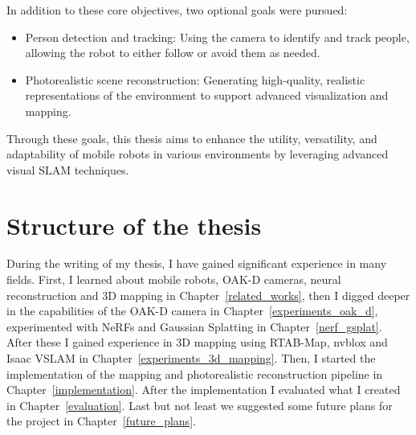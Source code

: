 In addition to these core objectives, two optional goals were pursued:
\begin{itemize}
\setlength\itemsep{0em}
    \item Person detection and tracking: Using the camera to identify and track people, allowing the robot to either follow or avoid them as needed.
    \item Photorealistic scene reconstruction: Generating high-quality, realistic representations of the environment to support advanced visualization and mapping.
\end{itemize}

Through these goals, this thesis aims to enhance the utility, versatility, and adaptability of mobile robots in various environments by leveraging advanced visual SLAM techniques.


\section{Structure of the thesis}

During the writing of my thesis, I have gained significant experience in many fields. First, I learned about mobile robots, OAK-D cameras, neural reconstruction and 3D mapping in Chapter~\ref{related_works}, then I digged deeper in the capabilities of the OAK-D camera in Chapter~\ref{experiments_oak_d}, experimented with NeRFs and Gaussian Splatting in Chapter~\ref{nerf_gsplat}. After these I gained experience in 3D mapping using RTAB-Map, nvblox and Isaac VSLAM in Chapter~\ref{experiments_3d_mapping}. Then, I started the implementation of the mapping and photorealistic reconstruction pipeline in Chapter~\ref{implementation}. After the implementation I evaluated what I created in Chapter~\ref{evaluation}. Last but not least we suggested some future plans for the project in Chapter~\ref{future_plans}.
